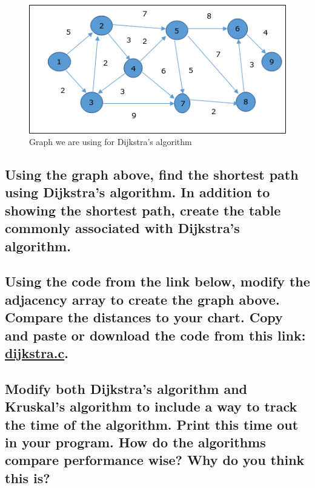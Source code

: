 \documentclass{article}
\begin{document}
\begin{figure}[!h]
\includegraphics[width=\linewidth]{dijkstragraph.jpg}
\caption{Graph we are using for Dijkstra's algorithm}
\end{figure}

\subsection{Using the graph above, find the shortest path using Dijkstra's algorithm. In addition to showing the shortest path, create the table commonly associated with Dijkstra's algorithm.}

\pagebreak{}

\subsection{Using the code from the link below, modify the adjacency array to create the graph above. Compare the distances to your chart. Copy and paste or download the code from this link: \href{https://github.com/ehawkvu/ds-n-a/blob/master/graphing/dijkstra.c}{dijkstra.c}.}

\vspace{36pt}

\subsection{Modify both Dijkstra's algorithm and Kruskal's algorithm to include a way to track the time of the algorithm. Print this time out in your program. How do the algorithms compare performance wise? Why do you think this is?}
\end{document}
